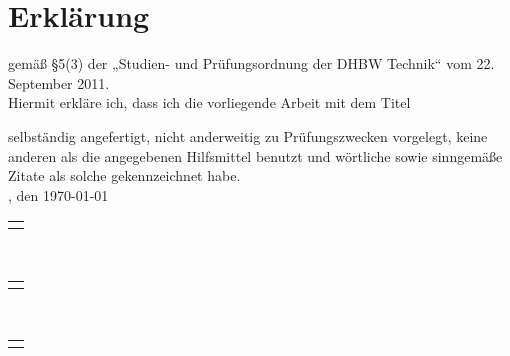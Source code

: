 
\chapter*{Erklärung}
gemäß §5(3) der „Studien- und Prüfungsordnung der DHBW Technik“ vom 22. September
2011. \\[12pt]
Hiermit erkläre ich, dass ich die vorliegende Arbeit mit dem Titel
\vspace{24pt}
\begin{large}
\begin{center}
	\textbf{\mytitle}
\end{center}
\end{large}
\vspace{24pt}
selbständig angefertigt, nicht anderweitig zu Prüfungszwecken vorgelegt, keine 
anderen als die angegebenen Hilfsmittel benutzt und wörtliche sowie sinngemäße 
Zitate als solche gekennzeichnet habe.\\[2em]
\myplace, den \today\\[6em]
\begin{raggedright}
	\begin{tabular}[h]{p{7cm}}
		\cline{1-1}
		\myauthora\\
	\end{tabular}
\end{raggedright}\\[4em]

\begin{raggedright}
	\begin{tabular}[h]{p{7cm}}
		\cline{1-1}
		\myauthorb\\
	\end{tabular}
\end{raggedright}\\[4em]

\begin{raggedright}
	\begin{tabular}[h]{p{7cm}}
		\cline{1-1}
		\myauthorc\\
	\end{tabular}
\end{raggedright}

\clearpage
